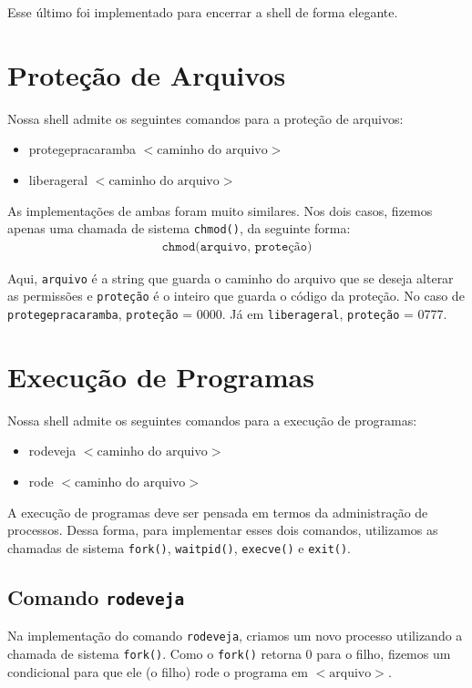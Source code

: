 \documentclass[a4paper, 12pt]{article}
\begin{document}
Esse último foi implementado para encerrar a shell de forma elegante.

\section{Proteção de Arquivos}

Nossa shell admite os seguintes comandos para a proteção de arquivos:
\begin{itemize}
\item protegepracaramba $<\textrm{caminho do arquivo}>$
\item liberageral $<\textrm{caminho do arquivo}>$
\end{itemize}

As implementações de ambas foram muito similares.  Nos dois casos,  fizemos apenas uma chamada de sistema \texttt{chmod()}, da seguinte forma:
\begin{align*}
\texttt{chmod(arquivo, proteção)}
\end{align*}

Aqui, \texttt{arquivo} é a string que guarda o caminho do arquivo que se deseja alterar as permissões e \texttt{proteção} é o inteiro que guarda o código da proteção.  No caso de \texttt{protegepracaramba}, \texttt{proteção} = 0000. Já em \texttt{liberageral}, \texttt{proteção} = 0777.

\section{Execução de Programas}

Nossa shell admite os seguintes comandos para a execução de programas:
\begin{itemize}
\item rodeveja $<\textrm{caminho do arquivo}>$
\item rode $<\textrm{caminho do arquivo}>$
\end{itemize}

A execução de programas deve ser pensada em termos da administração de processos. Dessa forma, para implementar esses dois comandos, utilizamos as chamadas de sistema \texttt{fork()}, \texttt{waitpid()}, \texttt{execve()} e \texttt{exit()}.

\subsection{Comando \texttt{rodeveja}}

Na implementação do comando \texttt{rodeveja}, criamos um novo processo utilizando a chamada de sistema \texttt{fork()}. Como o \texttt{fork()} retorna 0 para o filho, fizemos um condicional para que ele (o filho) rode o programa em $<\textrm{arquivo}>$.
\end{document}
